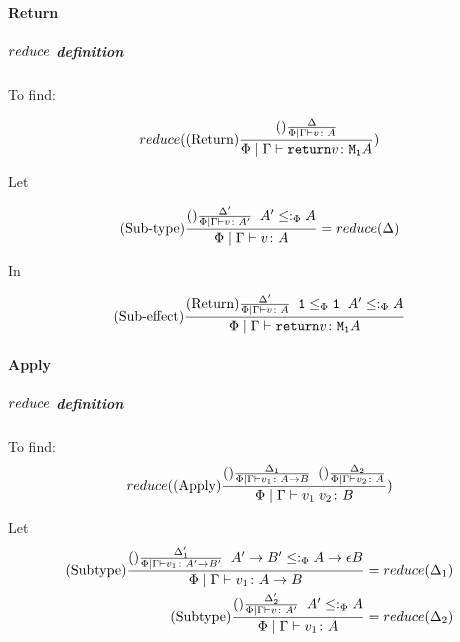 \documentclass{report}
\begin{document}
        \paragraph{Return}
        \subparagraph{$reduce$ definition}
        To find:
        
            \begin{equation}
                reduce((\text{Return}) \frac{
                    (\text{}) \frac{\Delta}{\Phi\mid\Gamma \vdash v \colon A}
                }{\Phi\mid\Gamma \vdash \texttt{return} v \colon \texttt{M}_{\texttt{1}}{A}})
            \end{equation}

            Let 

            \begin{equation}
                (\text{Sub-type}) \frac{
                    (\text{}) \frac{\Delta'}{\Phi\mid\Gamma \vdash v \colon A'}
                    \;\;
                    A' \leq:_\Phi A
                }{
                    \Phi\mid\Gamma \vdash v \colon A
                } = reduce(\Delta)
            \end{equation}

            In

            \begin{equation}
                (\text{Sub-effect}) \frac{
                    (\text{Return}) \frac{
                        \Delta'
                    }{
                        \Phi\mid\Gamma \vdash v \colon A
                    }
                    \;\;
                    \texttt{1}\leq_{\Phi}\texttt{1}
                    \;\;
                    A'\leq:_\Phi A
                }{
                    \Phi\mid\Gamma \vdash \texttt{return} v \colon \texttt{M}_{\texttt{1}}{A}
                }
            \end{equation}

        \paragraph{Apply}
        \subparagraph{$reduce$ definition}
        To find:
        \begin{equation}
            reduce((\text{Apply}) \frac{
                (\text{}) \frac{\Delta_1}{
                    \Phi\mid\Gamma \vdash v_1 \colon A\rightarrow B
                }
                \;\;
                (\text{}) \frac{\Delta_2}{
                    \Phi\mid\Gamma \vdash v_2 \colon A
                }
            }{
                \Phi\mid\Gamma \vdash v_1\; v_2 \colon B
            })
        \end{equation}

        Let
        \begin{align}
            (\text{Subtype}) \frac{
                (\text{}) \frac{\Delta'_1}{\Phi\mid\Gamma \vdash v_1 \colon A'\rightarrow B'}
                \;\;
                A'\rightarrow B'\leq:_\Phi A\rightarrow \epsilon{B}
            }{
                \Phi\mid\Gamma \vdash v_1 \colon A\rightarrow B
            } & = reduce(\Delta_1)\\
            (\text{Subtype}) \frac{
                (\text{}) \frac{\Delta'_2}{\Phi\mid\Gamma \vdash v \colon A'}
                \;\;
                A'\leq:_\Phi A
            }{
                \Phi\mid\Gamma \vdash v_1 \colon A
            } & = reduce(\Delta_2)
        \end{align}
\end{document}
